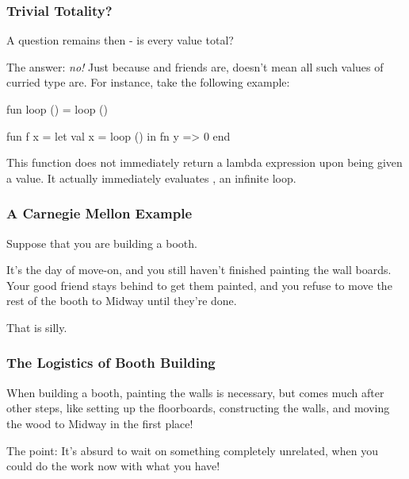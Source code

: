 \documentclass[aspectratio=169]{beamer}
\begin{document}
\begin{frame}[fragile]
  \frametitle{Trivial Totality?}

  A question remains then - is every value  total?

  \pause
  \vspace{\fill}
  
  The answer: \textit{no!} Just because  and friends are, doesn't mean
  all such values of curried type are. For instance, take the following example:

  \pause
  \begin{codeblock}
    fun loop () = loop () 

    fun f x = 
      let
        val x = loop ()
      in
        fn y => 0 
      end
  \end{codeblock}

  \pause
  \vspace{\fill}

  This function does not immediately return a lambda expression upon being given a
  value. It actually immediately evaluates , an infinite loop.
\end{frame}

\begin{frame}[fragile]
  \frametitle{A Carnegie Mellon Example}

  Suppose that you are building a booth.

  \pause
  \vspace{\fill}

  It's the day of move-on, and you still haven't finished painting the wall boards. Your
  good friend stays behind to get them painted, and you refuse to move the rest of 
  the booth to Midway until they're done.

  \pause
  \vspace{\fill}

  That is silly.
\end{frame}

\begin{frame}[fragile]
  \frametitle{The Logistics of Booth Building}

  When building a booth, painting the walls is necessary, but comes much after 
  other steps, like setting up the floorboards, constructing the walls, and 
  moving the wood to Midway in the first place! 

  \pause
  \vspace{\fill}

  The point: It's absurd to wait on something completely unrelated, when you
  could do the work now with what you have!
\end{frame}
\end{document}
